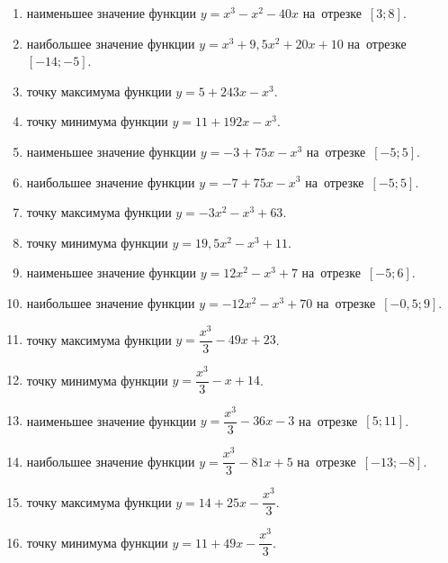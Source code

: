 \documentclass[a4paper,10pt]{article}
\begin{document}
\begin{enumerate}
\item {} наименьшее значение функции $y=x^3 -x^2-40x$ на~отрезке~$\left[3;8\right]$.

\item {} наибольшее значение функции $y=x^3 +9,5x^2+20x+10$ на~отрезке~$\left[-14;-5\right]$.

\item {} точку максимума функции $y=5+243x-x^3$.

\item {} точку минимума функции $y=11+192x-x^3$.

\item {} наименьшее значение функции $y=-3+75x-x^3$ на~отрезке~$\left[-5;5\right]$.

\item {} наибольшее значение функции $y=-7+75x-x^3$ на~отрезке~$\left[-5;5\right]$.

\item {} точку максимума функции $y=-3x^2-x^3+63$.

\item {} точку минимума функции $y=19,5x^2-x^3+11$.

\item {} наименьшее значение функции $y=12x^2-x^3+7$ на~отрезке~$\left[-5;6\right]$.

\item {} наибольшее значение функции $y=-12x^2-x^3+70$ на~отрезке~$\left[-0,5;9\right]$.

\item {} точку максимума функции $y=\dfrac{x^3}{3} -49x+23$.

\item {} точку минимума функции $y=\dfrac{x^3}{3} -x+14$.

\item {} наименьшее значение функции $y=\dfrac{x^3}{3} -36x-3$ на~отрезке~$\left[5;11\right]$.

\item {} наибольшее значение функции $y=\dfrac{x^3}{3} -81x+5$ на~отрезке~$\left[-13;-8\right]$.

\item {} точку максимума функции $y=14 +25x-\dfrac{x^3}{3}$.

\item {} точку минимума функции $y=11 +49x-\dfrac{x^3}{3}$.


\end{enumerate}
\end{document}
